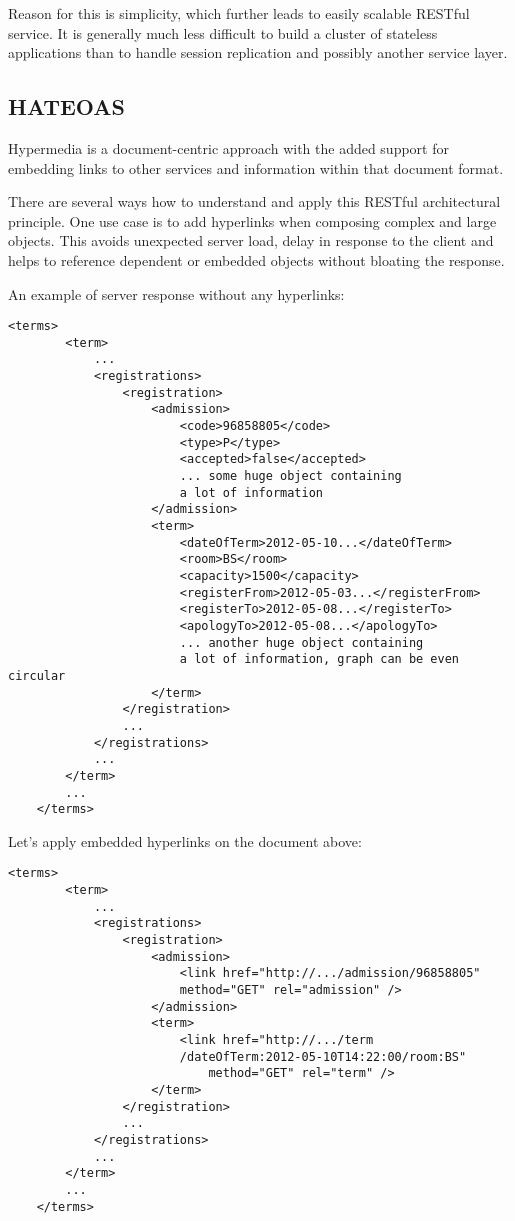 	Reason for this is simplicity, which further leads to easily scalable RESTful service. It is generally much less
	difficult to build a cluster of stateless applications than to handle session replication and possibly another service
	layer.
	
	\subsection{HATEOAS}
	
	\cite[p.~11]{restful} Hypermedia is a document-centric approach with the added support for embedding links to other
	services and information within that document format.
	
	There are several ways how to understand and apply this RESTful architectural principle. One use case is to add
	hyperlinks when composing complex and large objects. This avoids unexpected server load, delay in response to the
	client and helps to reference dependent or embedded objects without bloating the response.
	
	An example of server response without any hyperlinks:
	
	\begin{lstlisting}[tabsize=2]
	<terms>
		<term>
			...
			<registrations>
				<registration>
					<admission>
						<code>96858805</code>
						<type>P</type>
						<accepted>false</accepted>
						... some huge object containing 
						a lot of information
					</admission>
					<term>
						<dateOfTerm>2012-05-10...</dateOfTerm>
						<room>BS</room>
						<capacity>1500</capacity>
						<registerFrom>2012-05-03...</registerFrom>
						<registerTo>2012-05-08...</registerTo>
						<apologyTo>2012-05-08...</apologyTo>
						... another huge object containing 
						a lot of information, graph can be even circular
					</term>
				</registration>
				...
			</registrations>
			...
		</term>
		...
	</terms>
	\end{lstlisting}
	
	Let's apply embedded hyperlinks on the document above:
	
	\begin{lstlisting}[tabsize=2]
	<terms>
		<term>
			...
			<registrations>
				<registration>
					<admission>
						<link href="http://.../admission/96858805" 
						method="GET" rel="admission" />
					</admission>
					<term>
						<link href="http://.../term
						/dateOfTerm:2012-05-10T14:22:00/room:BS"
							method="GET" rel="term" />
					</term>
				</registration>
				...
			</registrations>
			...
		</term>
		...
	</terms>
	\end{lstlisting}
	
